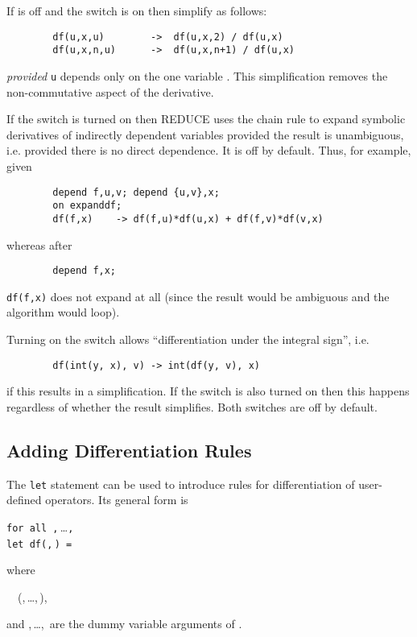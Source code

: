 If  is off and the switch 
is on then simplify as follows:
\begin{verbatim}
        df(u,x,u)        ->  df(u,x,2) / df(u,x)
        df(u,x,n,u)      ->  df(u,x,n+1) / df(u,x)
\end{verbatim}
\emph{provided} \texttt{u} depends only on the one variable .
This simplification removes the non-commutative aspect of the derivative.

\hypertarget{switch:EXPANDDF}{}
If the switch  is turned on then REDUCE uses
the chain rule to expand symbolic derivatives of indirectly dependent variables
provided the result is unambiguous, i.e. provided there is no direct dependence.
It is off by default.  Thus, for example, given
\begin{verbatim}
        depend f,u,v; depend {u,v},x;
        on expanddf;
        df(f,x)    -> df(f,u)*df(u,x) + df(f,v)*df(v,x)
\end{verbatim}
whereas after
\begin{verbatim}
        depend f,x;
\end{verbatim}
\texttt{df(f,x)} does not expand at all (since the result would be ambiguous
and the algorithm would loop).

\hypertarget{switch:ALLOWDFINT}{}
\hypertarget{switch:DFINT}{}
Turning on the switch  allows
``differentiation under the integral sign'', i.e.
\begin{verbatim}
        df(int(y, x), v) -> int(df(y, v), x)
\end{verbatim}
if this results in a simplification.  If the switch 
is also turned on then this happens regardless of whether the result
simplifies. Both switches are off by default.


\subsection{Adding Differentiation Rules}
\hypertarget{command:LETdf}{}

The \texttt{let} statement can be used to introduce
rules for differentiation of user-defined operators.  Its general form is
\begin{syntaxtable}
  \texttt{for all }\texttt{,}\,\dots\texttt{,}\, \\
    \qquad \texttt{let df(}\texttt{,}\,\texttt{)
    = }
\end{syntaxtable}
where
\begin{syntax}
  \ \BNFprod\ (,\,\dots,\,),
\end{syntax}
and
,\,\dots,\, are the dummy variable arguments of
.

